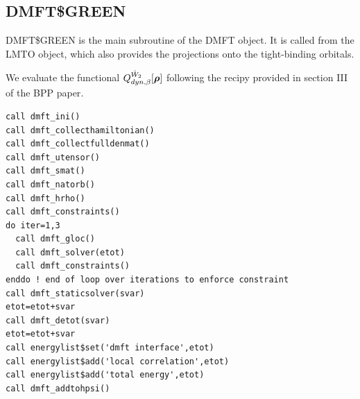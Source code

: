 \documentclass[11pt,a4paper]{report}
\begin{document}
\subsection{DMFT\$GREEN}
DMFT\$GREEN is the main subroutine of the DMFT object. It is called
from the LMTO object, which also provides the  projections onto the
tight-binding orbitals.

We evaluate the functional $Q^{\hat{W}_2}_{dyn,\beta}[\bm{\rho}]$
following the recipy provided in section III of the BPP
paper\cite{bloechl13_prb88_25139}.

\begin{verbatim}
call dmft_ini()
call dmft_collecthamiltonian()  
call dmft_collectfulldenmat()  
call dmft_utensor() 
call dmft_smat()
call dmft_natorb()
call dmft_hrho()
call dmft_constraints()
do iter=1,3
  call dmft_gloc() 
  call dmft_solver(etot) 
  call dmft_constraints()
enddo ! end of loop over iterations to enforce constraint
call dmft_staticsolver(svar) 
etot=etot+svar
call dmft_detot(svar)
etot=etot+svar      
call energylist$set('dmft interface',etot)
call energylist$add('local correlation',etot)
call energylist$add('total energy',etot)
call dmft_addtohpsi()
\end{verbatim}
\end{document}
